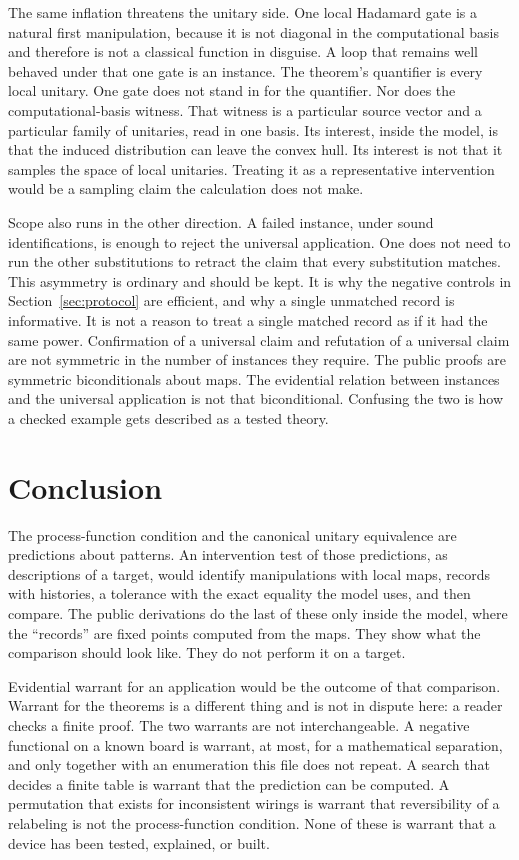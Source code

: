 \documentclass[11pt]{article}
\begin{document}
The same inflation threatens the unitary side. One local Hadamard gate is a natural first manipulation, because it is not diagonal in the computational basis and therefore is not a classical function in disguise. A loop that remains well behaved under that one gate is an instance. The theorem’s quantifier is every local unitary. One gate does not stand in for the quantifier. Nor does the computational-basis witness. That witness is a particular source vector and a particular family of unitaries, read in one basis. Its interest, inside the model, is that the induced distribution can leave the convex hull. Its interest is not that it samples the space of local unitaries. Treating it as a representative intervention would be a sampling claim the calculation does not make.

Scope also runs in the other direction. A failed instance, under sound identifications, is enough to reject the universal application. One does not need to run the other substitutions to retract the claim that every substitution matches. This asymmetry is ordinary and should be kept. It is why the negative controls in Section~\ref{sec:protocol} are efficient, and why a single unmatched record is informative. It is not a reason to treat a single matched record as if it had the same power. Confirmation of a universal claim and refutation of a universal claim are not symmetric in the number of instances they require. The public proofs are symmetric biconditionals about maps. The evidential relation between instances and the universal application is not that biconditional. Confusing the two is how a checked example gets described as a tested theory.

\section{Conclusion}
\label{sec:end}

The process-function condition and the canonical unitary equivalence are predictions about patterns. An intervention test of those predictions, as descriptions of a target, would identify manipulations with local maps, records with histories, a tolerance with the exact equality the model uses, and then compare. The public derivations do the last of these only inside the model, where the ``records'' are fixed points computed from the maps. They show what the comparison should look like. They do not perform it on a target.

Evidential warrant for an application would be the outcome of that comparison. Warrant for the theorems is a different thing and is not in dispute here: a reader checks a finite proof. The two warrants are not interchangeable. A negative functional on a known board is warrant, at most, for a mathematical separation, and only together with an enumeration this file does not repeat. A search that decides a finite table is warrant that the prediction can be computed. A permutation that exists for inconsistent wirings is warrant that reversibility of a relabeling is not the process-function condition. None of these is warrant that a device has been tested, explained, or built.
\end{document}
